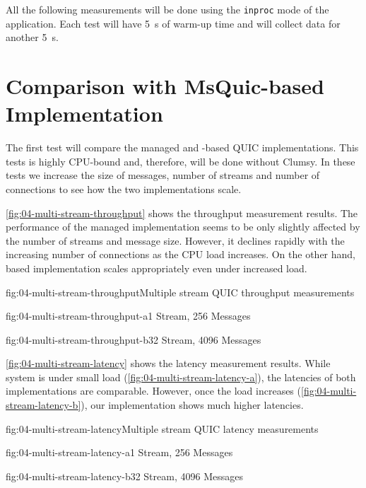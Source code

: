 All the following measurements will be done using the \texttt{inproc} mode of the application. Each
test will have \SI{5}{\second} of warm-up time and will collect data for another \SI{5}{\second}.

\section{Comparison with MsQuic-based Implementation}

The first test will compare the managed and \libmsquic{}-based QUIC implementations. This tests
is highly CPU-bound and, therefore, will be done without Clumsy. In these tests we increase the size
of messages, number of streams and number of connections to see how the two implementations scale.

\autoref{fig:04-multi-stream-throughput} shows the throughput measurement results. The performance
of the managed implementation seems to be only slightly affected by the number of streams and
message size. However, it declines rapidly with the increasing number of connections as the CPU load
increases. On the other hand, \libmsquic{} based implementation scales appropriately even under
increased load.


\begin{myFigure}{fig:04-multi-stream-throughput}{Multiple stream QUIC throughput measurements}
\begin{mySubfigure}{0.49\linewidth}{fig:04-multi-stream-throughput-a}{1 Stream, \SI{256}{\byte} Messages}
\footnotesize

\end{mySubfigure}
\begin{mySubfigure}{0.49\linewidth}{fig:04-multi-stream-throughput-b}{32 Stream, \SI{4096}{\byte} Messages}
\footnotesize

\end{mySubfigure}
\end{myFigure}

\autoref{fig:04-multi-stream-latency} shows the latency measurement results. While system is under
small load (\autoref{fig:04-multi-stream-latency-a}), the latencies of both implementations are
comparable. However, once the load increases (\autoref{fig:04-multi-stream-latency-b}), our
implementation shows much higher latencies.

\begin{myFigure}{fig:04-multi-stream-latency}{Multiple stream QUIC latency measurements}
\begin{mySubfigure}{0.49\linewidth}{fig:04-multi-stream-latency-a}{1 Stream, \SI{256}{\byte} Messages}
\footnotesize

\end{mySubfigure}
\begin{mySubfigure}{0.49\linewidth}{fig:04-multi-stream-latency-b}{32 Stream, \SI{4096}{\byte} Messages}
\footnotesize

\end{mySubfigure}
\end{myFigure}

